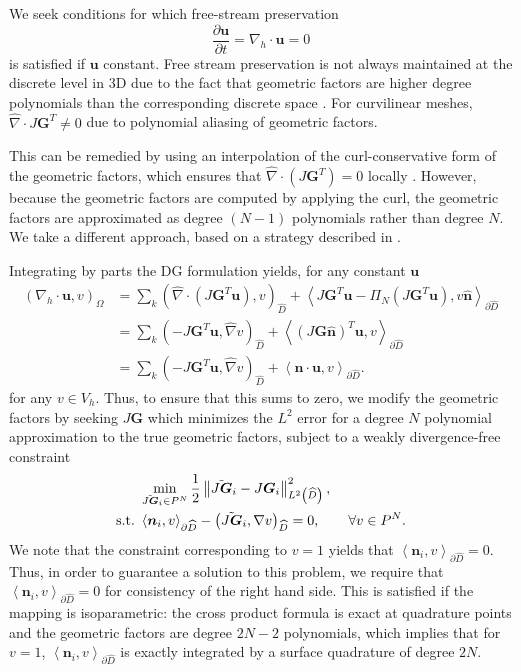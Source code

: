 \documentclass[preprint,10pt]{article}
\theoremstyle{definition}
\theoremstyle{lemma}
\theoremstyle{theorem}
\theoremstyle{assumption}
\renewcommand{\hat}{\widehat}
\newcommand{\pd}[2]{\frac{\partial#1}{\partial#2}}
\newcommand{\nor}[1]{\left\| #1 \right\|}
\newcommand{\LRp}[1]{\left( #1 \right)}
\newcommand{\LRa}[1]{\left\langle #1 \right\rangle}
\newcommand{\Grad} {\ensuremath{\nabla}}
\renewcommand{\d}{\partial}
\begin{document}
We seek conditions for which free-stream preservation 
\[
\pd{\bm{u}}{t} = \Grad_h \cdot \bm{u} = 0
\]
is satisfied if $\bm{u}$ constant.  Free stream preservation is not always maintained at the discrete level in 3D due to the fact that geometric factors are higher degree polynomials than the corresponding discrete space \cite{kopriva2006metric, johnen2013geometrical}.  For curvilinear meshes, $\hat{\Grad}\cdot{J\bm{G}^T} \neq 0$ due to polynomial aliasing of geometric factors.  

This can be remedied by using an interpolation of the curl-conservative form of the geometric factors, which ensures that $\hat{\Grad}\cdot\LRp{J\bm{G}^T} = 0$ locally \cite{visbal2002use, kopriva2006metric}.  However, because the geometric factors are computed by applying the curl, the geometric factors are approximated as degree $(N-1)$ polynomials rather than degree $N$.  We take a different approach, based on a strategy described in \cite{fernandez2016simultaneous}.  

Integrating by parts the DG formulation yields, for any constant $\bm{u}$
\begin{align*}
\LRp{\Grad_h \cdot \bm{u},v}_{\Omega} &= \sum_k \LRp{\hat{\Grad} \cdot \LRp{J\bm{G}^T\bm{u}},v }_{\hat{D}} + \LRa{J\bm{G}^T\bm{u} - \Pi_N \LRp{J\bm{G}^T\bm{u}}, v \hat{\bm{n}}}_{\d \hat{D}}\\
&= \sum_k \LRp{-J\bm{G}^T\bm{u},\hat{\Grad} v }_{\hat{D}} + \LRa{\LRp{J\bm{G}\hat{\bm{n}}}^T\bm{u}, v }_{\d \hat{D}}\\
&= \sum_k \LRp{-J\bm{G}^T\bm{u},\hat{\Grad} v }_{\hat{D}} + \LRa{\bm{n}\cdot \bm{u}, v }_{\d \hat{D}}.  
\end{align*}
for any $v\in V_h$.  
Thus, to ensure that this sums to zero, we modify the geometric factors by seeking $J\bm{G}$ which minimizes the $L^2$ error for a degree $N$ polynomial approximation to the true geometric factors, subject to a weakly divergence-free constraint
\begin{align*}
&\min_{\tilde{J\bm{G}}_i \in P^N} \frac{1}{2}\nor{\tilde{J\bm{G}}_i - J\bm{G}_i}_{L^2\LRp{\hat{D}}}^2,\\ 
{\rm s.t.\ } &\LRa{\bm{n}_i,v}_{\d \hat{D}}-\LRp{\tilde{J\bm{G}}_i,\Grad v}_{\hat{D}} = 0, \qquad \forall v\in P^N.
\end{align*}
We note that the constraint corresponding to $v = 1$ yields that $\LRa{\bm{n}_i,v}_{\d \hat{D}} = 0$.  Thus, in order to guarantee a solution to this problem, we require that $\LRa{\bm{n}_i,v}_{\d \hat{D}} = 0$ for consistency of the right hand side.  This is satisfied if the mapping is isoparametric: the cross product formula is exact at quadrature points and the geometric factors are degree $2N-2$ polynomials, which implies that for $v = 1$, $\LRa{\bm{n}_i,v}_{\d \hat{D}}$ is exactly integrated by a surface quadrature of degree $2N$.
\end{document}

